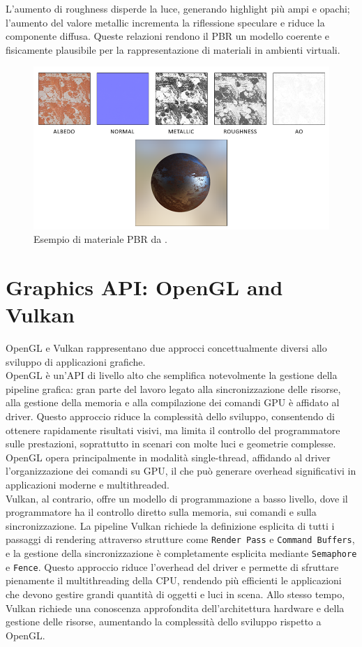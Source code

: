 \documentclass[12pt,a4paper,openright,twoside]{book}
\begin{document}
\noindent
L'aumento di roughness disperde la luce, generando highlight più ampi e opachi;
l'aumento del valore metallic incrementa la riflessione speculare e riduce la componente diffusa.
Queste relazioni rendono il PBR un modello coerente e fisicamente plausibile per la rappresentazione
di materiali in ambienti virtuali.
\begin{figure}[H]
   \centering
   \includegraphics[width=.8\linewidth]{figures/pbr_material_example.png}
   \caption{Esempio di materiale PBR da \cite{learnopengl}.}
   \label{fig:pbr-material-example}
\end{figure}

\section{Graphics API: OpenGL and Vulkan}
OpenGL e Vulkan rappresentano due approcci concettualmente diversi allo sviluppo di applicazioni grafiche. \\
OpenGL è un'API di livello alto che semplifica notevolmente la gestione della pipeline grafica: gran parte del lavoro
legato alla sincronizzazione delle risorse, alla gestione della memoria e alla compilazione dei comandi GPU è affidato
al driver. Questo approccio riduce la complessità dello sviluppo, consentendo di ottenere rapidamente risultati visivi,
ma limita il controllo del programmatore sulle prestazioni, soprattutto in scenari con molte luci e geometrie complesse.
OpenGL opera principalmente in modalità single-thread, affidando al driver l'organizzazione dei comandi su GPU, il che può
generare overhead significativi in applicazioni moderne e multithreaded. \\
Vulkan, al contrario, offre un modello di programmazione a basso livello, dove il programmatore ha il controllo diretto
sulla memoria, sui comandi e sulla sincronizzazione. La pipeline Vulkan richiede la definizione esplicita di tutti i
passaggi di rendering attraverso strutture come \texttt{Render Pass} e \texttt{Command Buffers}, e la gestione della 
sincronizzazione è completamente esplicita mediante \texttt{Semaphore} e \texttt{Fence}. Questo approccio riduce
l'overhead del driver e permette di sfruttare pienamente il multithreading della CPU, rendendo più efficienti
le applicazioni che devono gestire grandi quantità di oggetti e luci in scena. Allo stesso tempo, Vulkan richiede
una conoscenza approfondita dell'architettura hardware e della gestione delle risorse, aumentando la complessità
dello sviluppo rispetto a OpenGL.
\end{document}
